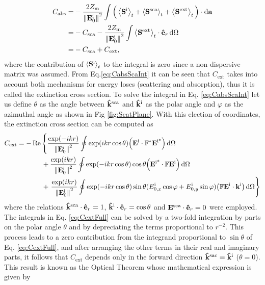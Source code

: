 %
\begin{align}
C_\text{abs} = & - \frac{2Z_\text{m}}{\norm{\vb{E}^\text{i}_0}^2}\int\Big(\ev{\vb{S}^\text{i}}_t + \ev{\vb{S}^\text{sca}}_t + \ev{\vb{S}^\text{ext}}_t\Big)\cdot\dd{\vb{a}}
					\notag \\
			=  & - C_\text{sca} - \frac{2Z_\text{m}}{\norm{\vb{E}_0^\text{i}}^2}\int   \ev{\vb{S}^\text{ext}}_t\cdot \vu{e}_r\dd{\Omega}
					\notag \\
			= & -C_\text{sca} + C_\text{ext},
\label{eq:CabsScaInt}
\end{align}
%
where the contribution of $\ev{\vb{S}^\text{i}}_t$ to the integral is zero since a non-dispersive matrix was assumed. From Eq.\eqref{eq:CabsScaInt} it can be seen that $C_\text{ext}$ takes into account both mechanisms for energy loses (scattering and absorption), thus it is called the extinction cross section. To solve the integral in Eq. \eqref{eq:CabsScaInt} let us define $\theta$ as the angle between $\vu{k}^\text{sca}$ and $\vu{k}^\text{i}$ as the polar angle  and  $\varphi$ as the azimuthal angle as shown in Fig \ref{fig:ScatPlane}. With this election of coordinates,  the extinction cross section can be computed as
%
\begin{align}
C_\text{ext} = - &\Re \left\{
			 \frac{\exp(-ikr) }{\norm{\vb{E}_0^\text{i}}^2}
			 					\oint \exp(ikr\cos\theta)\qty(\vb{E}^\text{i}\cdot \mathbb{F}^*\vb{E}^\text{i*})  \dd{\Omega} \right.	\notag\\
			&\hspace*{1.5em}+\frac{\exp(ikr) }{\norm{\vb{E}_0^\text{i}}^2}
								\oint \exp(-ikr\cos\theta)\cos\theta \qty(\vb{E}^\text{i*}\cdot \mathbb{F}\vb{E}^\text{i})     \dd{\Omega}
\label{eq:CextFull}\\
			&\hspace*{1.5em}+\left.\frac{\exp(ikr) }{\norm{\vb{E}^\text{i}_0}^2}
								\oint \exp(-ikr\cos\theta)\sin\theta(E_{0,x}^\text{i}\cos\varphi+E_{0,y}^\text{i}\sin\varphi)
									\qty(\mathbb{F}\vb{E}^\text{i}\cdot\vb{k}^\text{i})    \dd{\Omega}  \right\} \notag
\end{align}
%
where the relations $\vu{k}^\text{sca}\cdot\vu{e}_r = 1$, $\vu{k}^\text{i}\cdot\vu{e}_r = \cos\theta$ and  $\vb{E}^\text{sca}\cdot\vu{e}_r = 0$ were employed. The integrals in Eq. \eqref{eq:CextFull} can be solved by a two-fold integration by parts on the polar angle $\theta$ and by depreciating the terms proportional to $r^{-2}$. This process leads to a zero contribution from the integrand proportional to $\sin\theta$  of Eq. \eqref{eq:CextFull}, and after arranging the other terms in their real and imaginary parts, it follows that $C_\text{ext}$ depends only in the forward direction  $\vu{k}^\text{sac} = \vu{k}^\text{i}$ ($\theta =0$). This result is known as the Optical Theorem whose mathematical expression is given by \cite{tsang_scattering_2000,pellarin_forward_2019,newton_optical_1976}
